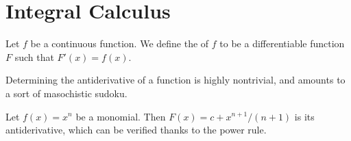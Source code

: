 \section{Integral Calculus}

\begin{definition}\label{calculus:integral-0000}%
Let $f$ be a continuous function. We define the 
of $f$ to be a differentiable function $F$ such that $F'(x)=f(x)$.

Determining the antiderivative of a function is highly nontrivial, and
amounts to a sort of masochistic sudoku.

\begin{example}\label{calculus:integral-0001}%
Let $f(x)=x^{n}$ be a monomial. Then $F(x)=c+x^{n+1}/(n+1)$ is its
antiderivative, which can be verified thanks to the power rule.
\end{example}
\end{definition}

